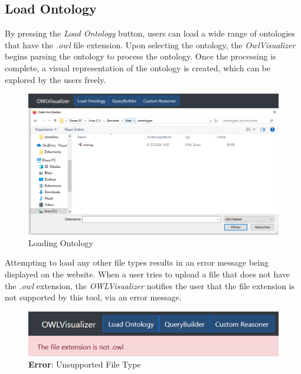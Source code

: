 \subsection{Load Ontology}

By pressing the \textit{Load Ontology} button, users can load a wide range of ontologies that have the \textit{.owl} file extension.
Upon selecting the ontology, the \textit{OwlVisualizer} begins parsing the ontology to process the ontology. 
Once the processing is complete, a visual representation of the ontology is created, which can be explored by the users freely. 


\begin{figure}[H]
    \includegraphics[scale=0.35]{Graphics/OwlVisualizer/loadOntology1.png}
    \centering
    \caption{Loading Ontology}
    \label{fig:loadOntology1}
\end{figure}

Attempting to load any other file types results in an error message being displayed on the website. 
When a user tries to upload a file that does not have the \textit{.owl} extension, the \textit{OWLVisualizer} notifies 
the user that the file extension is not supported by this tool, via an error message. 

\begin{figure}[H]
    \includegraphics[scale=0.5]{Graphics/OwlVisualizer/loadOntology2.png}
    \centering
    \caption{\textbf{Error}: Unsupported File Type}
    \label{fig:loadOntology2}
\end{figure}

